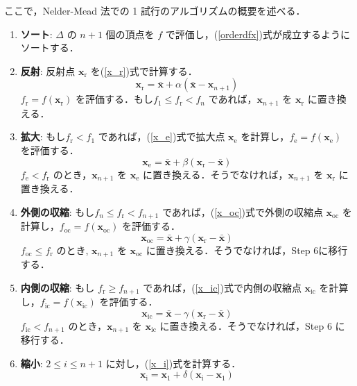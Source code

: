 \documentclass[twocolumn]{jarticle}
\begin{document}
    ここで，Nelder-Mead 法での 1 試行のアルゴリズムの概要を述べる．
    \begin{enumerate}[Step 1]
        \item \textbf{ソート}: $\Delta$ の $n+1$ 個の頂点を $f$ で評価し，(\ref{orderdfx})式が成立するようにソートする．
        \item \textbf{反射}: 反射点 $\bm{x}_\mathrm{r}$ を(\ref{x_r})式で計算する．
        \begin{equation}
            \label{x_r}
            \bm{x}_\mathrm{r} = \bar{\bm{x}} + \alpha(\bar{\bm{x}} - \bm{x}_{n+1})
        \end{equation}
        $f_\mathrm{r} = f(\bm{x}_\mathrm{r})$ を評価する．もし$f_1 \leq f_\mathrm{r} < f_n$ であれば，$\bm{x}_{n+1}$ を $\bm{x}_\mathrm{r}$ に置き換える．
        \item \textbf{拡大}: もし$f_\mathrm{r} < f_1$ であれば，(\ref{x_e})式で拡大点 $\bm{x}_\mathrm{e}$ を計算し，$f_\mathrm{e} = f(\bm{x}_\mathrm{e})$ を評価する．
        \begin{equation}
            \label{x_e}
            \bm{x}_\mathrm{e} = \bar{\bm{x}} + \beta(\bm{x}_\mathrm{r} - \bar{\bm{x}})
        \end{equation}
        $f_\mathrm{e} < f_\mathrm{r}$ のとき，$\bm{x}_{n+1}$ を $\bm{x}_\mathrm{e}$ に置き換える．そうでなければ，$\bm{x}_{n+1}$ を $\bm{x}_\mathrm{r}$ に置き換える．
        \item \textbf{外側の収縮}: もし$f_n \leq f_\mathrm{r} < f_{n+1}$ であれば，(\ref{x_oc})式で外側の収縮点 $\bm{x}_\mathrm{oc}$ を計算し，$f_\mathrm{oc} = f(\bm{x}_\mathrm{oc})$ を評価する．
        \begin{equation}
            \label{x_oc}
            \bm{x}_\mathrm{oc} = \bar{\bm{x}} + \gamma(\bm{x}_\mathrm{r} - \bar{\bm{x}})
        \end{equation}
        $f_\mathrm{oc} \leq f_\mathrm{r}$ のとき, $\bm{x}_{n+1}$ を $\bm{x}_\mathrm{oc}$ に置き換える．そうでなければ，Step 6に移行する．
        \item \textbf{内側の収縮}: もし $f_\mathrm{r} \geq f_{n+1}$ であれば，(\ref{x_ic})式で内側の収縮点 $\bm{x}_\mathrm{ic}$ を計算し，$f_\mathrm{ic} = f(\bm{x}_\mathrm{ic})$ を評価する．
        \begin{equation}
            \label{x_ic}
            \bm{x}_\mathrm{ic} = \bar{\bm{x}} - \gamma(\bm{x}_\mathrm{r} - \bar{\bm{x}})
        \end{equation}
        $f_\mathrm{ic} < f_{n+1}$ のとき，$\bm{x}_{n+1}$ を $\bm{x}_\mathrm{ic}$ に置き換える．そうでなければ，Step 6 に移行する．
        \item \textbf{縮小}: $2 \leq i \leq n+1$ に対し，(\ref{x_i})式を計算する．
        \begin{equation}
            \label{x_i}
            \bm{x}_\mathrm{i} = \bm{x}_1 + \delta(\bm{x}_\mathrm{i} - \bm{x}_1)
        \end{equation}
    \end{enumerate}
\end{document}
